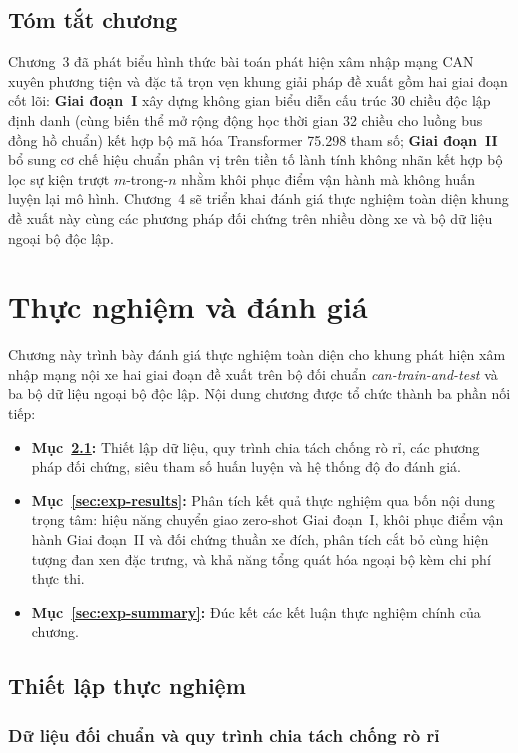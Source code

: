 \documentclass[12pt, a4paper, reqno, oneside]{book}
\begin{document}
\section{Tóm tắt chương}\label{sec:method-summary}
Chương~3 đã phát biểu hình thức bài toán phát hiện xâm nhập mạng CAN xuyên phương tiện và đặc tả trọn vẹn khung giải pháp đề xuất gồm hai giai đoạn cốt lõi: \textbf{Giai đoạn~I} xây dựng không gian biểu diễn cấu trúc 30 chiều độc lập định danh (cùng biến thể mở rộng động học thời gian 32 chiều cho luồng bus đồng hồ chuẩn) kết hợp bộ mã hóa Transformer 75.298 tham số; \textbf{Giai đoạn~II} bổ sung cơ chế hiệu chuẩn phân vị trên tiền tố lành tính không nhãn kết hợp bộ lọc sự kiện trượt $m$-trong-$n$ nhằm khôi phục điểm vận hành mà không huấn luyện lại mô hình. Chương~4 sẽ triển khai đánh giá thực nghiệm toàn diện khung đề xuất này cùng các phương pháp đối chứng trên nhiều dòng xe và bộ dữ liệu ngoại bộ độc lập.

\chapter{Thực nghiệm và đánh giá}\label{chap:results}

Chương này trình bày đánh giá thực nghiệm toàn diện cho khung phát hiện xâm nhập mạng nội xe hai giai đoạn đề xuất trên bộ đối chuẩn \textit{can-train-and-test} và ba bộ dữ liệu ngoại bộ độc lập. Nội dung chương được tổ chức thành ba phần nối tiếp:
\begin{itemize}
  \item \textbf{Mục~\ref{sec:exp-setup}:} Thiết lập dữ liệu, quy trình chia tách chống rò rỉ, các phương pháp đối chứng, siêu tham số huấn luyện và hệ thống độ đo đánh giá.
  \item \textbf{Mục~\ref{sec:exp-results}:} Phân tích kết quả thực nghiệm qua bốn nội dung trọng tâm: hiệu năng chuyển giao zero-shot Giai đoạn~I, khôi phục điểm vận hành Giai đoạn~II và đối chứng thuần xe đích, phân tích cắt bỏ cùng hiện tượng đan xen đặc trưng, và khả năng tổng quát hóa ngoại bộ kèm chi phí thực thi.
  \item \textbf{Mục~\ref{sec:exp-summary}:} Đúc kết các kết luận thực nghiệm chính của chương.
\end{itemize}

\section{Thiết lập thực nghiệm}\label{sec:exp-setup}

\subsection{Dữ liệu đối chuẩn và quy trình chia tách chống rò rỉ}\label{subsec:exp-data}
\end{document}

